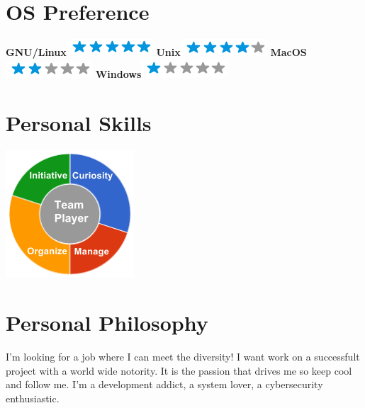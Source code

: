 \documentclass[]{friggeri-cv}
\begin{document}
\begin{aside}
  \section{OS Preference}
    \textbf{GNU/Linux}\includegraphics[scale=0.40]{img/5stars.png}
    \textbf{Unix}\includegraphics[scale=0.40]{img/4stars.png}
    \textbf{MacOS}\includegraphics[scale=0.40]{img/2stars.png}
    \textbf{Windows}\includegraphics[scale=0.40]{img/1stars.png}
    ~
  \section{Personal Skills}
    \includegraphics[scale=0.62]{img/personal.png}
    ~
\end{aside}

\section{Personal Philosophy}
    I'm looking for a job where I can meet the diversity! I want work on a successfult project with a world wide notority.
    It is the passion that drives me so keep cool and follow me. I'm a development addict, a system lover, a cybersecurity enthusiastic.
\end{document}
